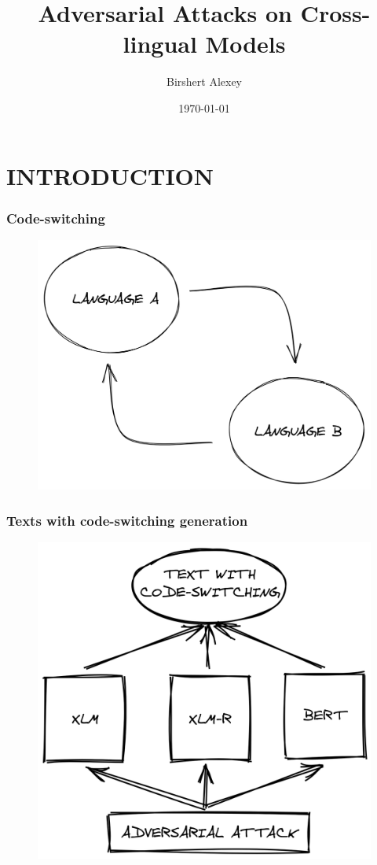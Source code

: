 \documentclass{beamer}
\title{Adversarial Attacks on Cross-lingual Models}
\author{Birshert Alexey}
\date{\today}
\begin{document}
\begin{frame}
\titlepage
\end{frame}


\section{INTRODUCTION}

\begin{frame}
\frametitle{Code-switching}
\begin{figure}
	\includegraphics[width=0.8\linewidth]{images/1.png}
\end{figure}
\end{frame}


\begin{frame}
\frametitle{Texts with code-switching generation}
\begin{figure}
	\includegraphics[width=0.7\linewidth]{images/3.png}
\end{figure}
\end{frame}
\end{document}
